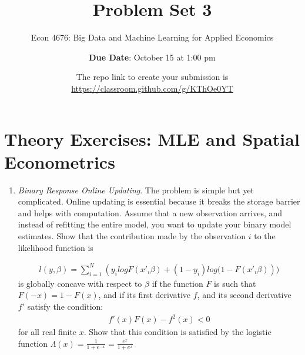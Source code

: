 \documentclass[12pt,onecolumn]{article}
\title{Problem Set 3}
\subtitle{Econ 4676: Big Data and Machine Learning for Applied Economics}
\author{{\bf Due Date}: October 15 at 1:00 pm}
\date{}
\date{The repo link to create your submission is \url{https://classroom.github.com/g/KThOe0YT}}
\begin{document}
\maketitle

\section{Theory Exercises: MLE and Spatial Econometrics}

\begin{enumerate}
  
  \item {\it Binary Response Online Updating}. The problem is simple but yet complicated. Online updating is essential because it breaks the storage barrier and helps with computation. Assume that a new observation arrives, and instead of refitting the entire model, you want to update your binary model estimates. Show that the contribution made by the observation $i$ to the likelihood function is

\begin{align}
l(y,\beta) = \sum_{i=1}^N \left( y_i log F(x'_i\beta) + (1-y_i) log (1-F(x'_i\beta)  \right))
\end{align}
  is globally concave with respect to $\beta$ if the function $F$ is such that $F(-x)=1-F(x)$, and if its first derivative $f$, and its second derivative $f'$ satisfy the condition:
  \begin{align}
  f'(x)F(x)-f^2(x)<0
  \end{align}
  for all real finite $x$. Show that this condition is satisfied by the logistic function $\Lambda(x)=\frac{1}{1+e^{-x}}=\frac{e^{x}}{1+e^{x}}$


\end{enumerate}
\end{document}

